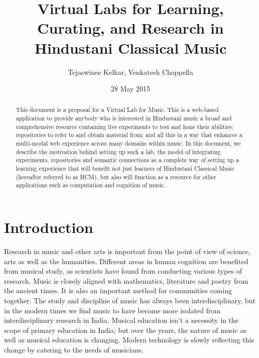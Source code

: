 \documentclass{tufte-handout}
\title{Virtual Labs for Learning, Curating, and Research in Hindustani Classical Music}
\author{Tejaswinee Kelkar,
 Venkatesh Choppella}
\date{28 May 2015}
\begin{document}
\maketitle%

\begin{abstract}
\noindent This document is a proposal for a Virtual Lab for Music. 
This is a web-based application to provide anybody who is interested in Hindustani music a broad and comprehensive resource containing live experiments to test and hone their abilities; repositories to refer to and obtain material from; and all this in a way that enhances a multi-modal web experience across many domains within music.
In this document, we describe the motivation behind setting up such a lab, the model of integrating experiments, repositories and semantic connections as a complete way of setting up a learning experience that will benefit not just learners of Hindustani Classical Music (hereafter referred to as HCM), but also will function as a resource for other applications such as computation and cognition of music.
\end{abstract}


\section{Introduction}\label{sec:introduction}

Research in music and other arts is important from the point of view of science, arts as well as the humanities. Different areas in human cognition are benefited from musical study, as scientists have found from conducting various types of research. Music is closely aligned with mathematics, literature and poetry from the ancient times. It is also an important method for communities coming together. The study and discipline of music has always been interdisciplinary, but in the modern times we find music to have become more isolated from interdisciplinary research in India. Musical education isn't a necessity in the scope of primary education in India; but over the years, the nature of music as well as musical education is changing. Modern technology is slowly reflecting this change by catering to the needs of musicians.
\end{document}
